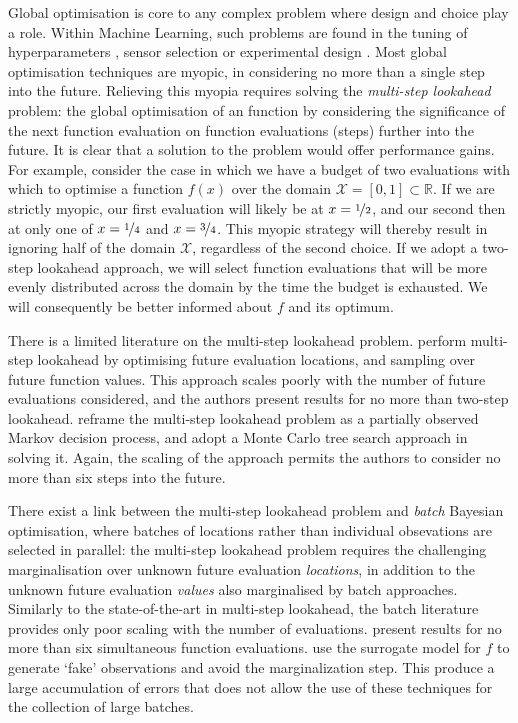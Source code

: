 \documentclass[twoside]{article}
\newcommand{\reals}{\mathbb{R}}
\newcommand{\sX}{\mathcal{X}}
\begin{document}
Global optimisation is core to any complex problem where design and choice play a role. 
Within Machine Learning, such problems are found in the tuning of hyperparameters \citep{Snoek*Larochelle*Adams_2012}, sensor selection \citep{Garnett*Osborne*Roberts_2010} or experimental design \citep{martinez-cantin_bayesian_2009}. 
Most global optimisation techniques are myopic, in considering no more than a single step into the future. 
Relieving this myopia requires solving the \emph{multi-step lookahead} problem: the global optimisation of an function by considering the significance of the next function evaluation on function evaluations (steps) further into the future. 
It is clear that a solution to the problem would offer performance gains.
For example, consider the case in which we have a budget of two evaluations with which to optimise a function $f(x)$ over the domain $\sX = [0, 1] \subset \reals$. 
If we are strictly myopic, our first evaluation will likely be at 
$x=\nicefrac{1}{2}$, and our second then at only one of $x=\nicefrac{1}{4}$ and $x=\nicefrac{3}{4}$. 
This myopic strategy will thereby result in ignoring half of the domain $\sX$, regardless of the second choice. 
If we adopt a two-step lookahead approach, we will select function evaluations that will be more evenly distributed across the domain by the time the budget is exhausted. 
We will consequently be better informed about $f$ and its optimum.

There is a limited literature on the multi-step lookahead problem.
\citep{osborne_gaussian_2009} perform multi-step lookahead by optimising future evaluation locations, and sampling over future function values. 
This approach scales poorly with the number of future evaluations considered, and the authors present results for no more than two-step lookahead.
\citep{Marchant*Ramos*Sanner*2014} reframe the multi-step lookahead problem as a partially observed Markov decision process, and adopt a Monte Carlo tree search approach in solving it. 
Again, the scaling of the approach permits the authors to consider no more than six steps into the future. 

\citep{StreltsovVakili1999}

There exist a link between the multi-step lookahead problem and \emph{batch} Bayesian optimisation, where batches of locations rather than individual obsevations are selected in parallel: the multi-step lookahead problem requires the challenging marginalisation over unknown future evaluation \emph{locations}, in addition to the unknown future evaluation \emph{values} also marginalised by batch approaches. 
Similarly to the state-of-the-art in multi-step lookahead, the batch literature provides only poor scaling with the number of evaluations.
\citep{Ginsbourger2009} present results for no more than six simultaneous function evaluations.
\citep{Azimi2011,Azimi2012} use the surrogate model for $f$ to generate `fake' observations and avoid the marginalization step. 
This produce a large accumulation of errors that does not allow the use of these techniques for the collection of large batches.
\end{document}
